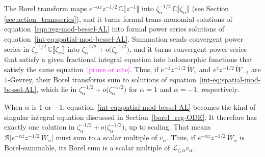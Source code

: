 \documentclass{article}
\theoremstyle{definition}
\newcommand{\C}{\mathbb{C}}
\newcommand{\laplace}{\mathcal{L}}
\newcommand{\borel}{\mathcal{B}}
\begin{document}
The Borel transform maps $e^{-\alpha z} z^{-1/2}\,\C\llbracket z^{-1} \rrbracket$ into $\zeta_\alpha^{-1/2}\,\C\llbracket \zeta_\alpha \rrbracket$ (see Section \ref{sec:action_transseries}), and it turns formal trans-monomial solutions of equation~\eqref{eqn:reg-mod-bessel-AL} into formal power series solutions of equation~\eqref{int-eq:spatial-mod-bessel-AL}. Summation sends convergent power series in $\zeta_\alpha^{-1/2}\,\C\llbracket \zeta_\alpha \rrbracket$ into $\zeta_\alpha^{-1/2}+ o\big(\zeta_\alpha^{-1/2}\big)$, and it turns convergent power series that satisfy a given fractional integral equation into holomorphic functions that satisfy the same equation~\textcolor{magenta}{[prove or cite]}. Thus, if $e^{-z} z^{-1/2}\,\tilde{W}_1$ and $e^z z^{-1/2}\,\tilde{W}_{-1}$ are $1$-Gevrey, their Borel transforms sum to solutions of equation~\eqref{int-eq:spatial-mod-bessel-AL}, which lie in $\zeta_\alpha^{-1/2} + o\big(\zeta_\alpha^{-1/2}\big)$ for $\alpha = 1$ and $\alpha = -1$, respectively.

When $\alpha$ is $1$ or $-1$, equation~\eqref{int-eq:spatial-mod-bessel-AL} becomes the kind of singular integral equation discussed in Section~\ref{borel_reg-ODE}. It therefore has exactly one solution in $\zeta_\alpha^{-1/2} + o\big(\zeta_\alpha^{-1/2}\big)$, up to scaling. That means $\borel\big[ e^{-\alpha z} z^{-1/2}\,\tilde{W}_\alpha \big]$ must sum to a scalar multiple of $v_\alpha$. Thus, if $e^{-\alpha z} z^{-1/2}\,\tilde{W}_\alpha$ is Borel-summable, its Borel sum is a scalar multiple of $\laplace_{\zeta, \alpha} v_\alpha$.
\end{document}
